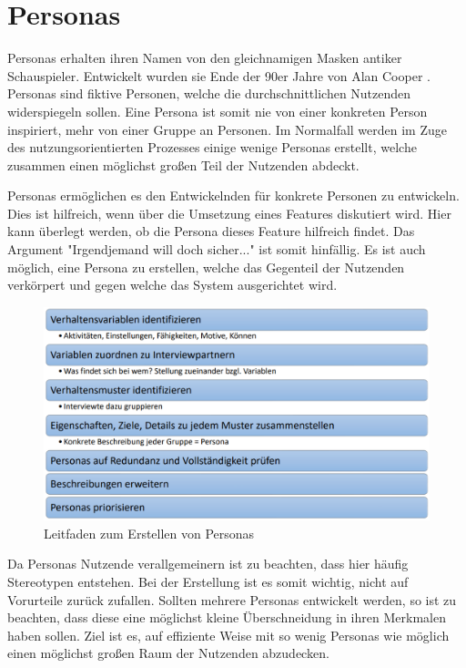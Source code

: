 \section{Personas}\label{sec:persona}

Personas erhalten ihren Namen von den gleichnamigen Masken antiker Schauspieler.
Entwickelt wurden sie Ende der 90er Jahre von Alan Cooper \cite{PersonaCooper}.
Personas sind fiktive Personen, welche die durchschnittlichen Nutzenden widerspiegeln sollen.
Eine Persona ist somit nie von einer konkreten Person inspiriert, mehr von einer Gruppe an Personen.
Im Normalfall werden im Zuge des nutzungsorientierten Prozesses einige wenige Personas erstellt, welche zusammen einen möglichst großen Teil der Nutzenden abdeckt.

Personas ermöglichen es den Entwickelnden für konkrete Personen zu entwickeln.
Dies ist hilfreich, wenn über die Umsetzung eines Features diskutiert wird.
Hier kann überlegt werden, ob die Persona dieses Feature hilfreich findet.
Das Argument "Irgendjemand will doch sicher..." ist somit hinfällig.
Es ist auch möglich, eine Persona zu erstellen, welche das Gegenteil der Nutzenden verkörpert und gegen welche das System ausgerichtet wird.

\begin{figure}[htp]
    \centering
    \includegraphics[width=\textwidth]{images/Persona-Leitfaden.png}
    \caption{Leitfaden zum Erstellen von Personas}
    \label{fig:personaLeitfaden}
\end{figure}

Da Personas Nutzende verallgemeinern ist zu beachten, dass hier häufig Stereotypen entstehen.
Bei der Erstellung ist es somit wichtig, nicht auf Vorurteile zurück zufallen.
Sollten mehrere Personas entwickelt werden, so ist zu beachten, dass diese eine möglichst kleine Überschneidung in ihren Merkmalen haben sollen.
Ziel ist es, auf effiziente Weise mit so wenig Personas wie möglich einen möglichst großen Raum der Nutzenden abzudecken.

